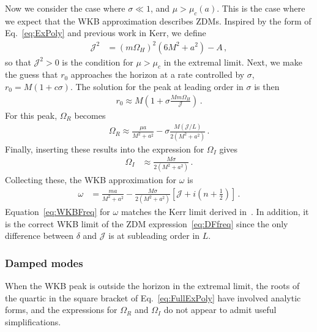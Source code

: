 \begin{refsection}
Now we consider the case where $\sigma \ll1$, and $\mu >\mu_c(a)$. This is the case where we expect that the WKB approximation describes ZDMs. 
Inspired by the form of Eq.~\eqref{eq:ExPoly} and previous work in Kerr, we define
\begin{align}
\mathcal J^2 & = (m \Omega_H)^2(6M^2 +a^2) - A \,,
\end{align}
so that $\mathcal J^2  > 0$ is the condition for $\mu > \mu_c$ in the extremal limit. 
Next, we make the guess that $r_0$ approaches the horizon at a rate controlled by $\sigma$, $r_0 = M( 1+ c \sigma)$.
The solution for the peak at leading order in $\sigma$ is then
\begin{align}
r_0 \approx M\left(1 + \sigma \frac{M m \Omega_H}{\mathcal J} \right) \,.
\end{align}
For this peak, $\Omega_R$ becomes
\begin{align}
\label{eq:WKBOmegaZDM}
\Omega_R \approx \frac{\mu a}{M^2+a^2} - \sigma \frac{M (\mathcal J/L)}{2(M^2+a^2)} \,.
\end{align}
Finally, inserting these results into the expression for $\Omega_I$ gives
\begin{align}
\Omega_I & \approx \frac{M \sigma}{2(M^2+a^2)}\,.
\end{align}
Collecting these, the WKB approximation for $\omega$ is
\begin{align}
\label{eq:WKBFreq}
\omega & = \frac{m a}{M^2 +a^2} - \frac{M \sigma}{2(M^2+a^2)} \left[ \mathcal J + i \left(n + \frac 12 \right) \right]\,.
\end{align}
Equation~\eqref{eq:WKBFreq} for $\omega$ matches the Kerr limit derived in~\cite{Yang:2012he,Yang:2013uba}. 
In addition, it is the correct WKB limit of the ZDM expression~\eqref{eq:DFfreq} since the only difference between $\delta$ and $\mathcal J$ is at subleading order in $L$. 


\subsubsection{Damped modes}
\label{sec:DampedModes}

When the WKB peak is outside the horizon in the extremal limit, the roots of the quartic in the square bracket of Eq.~\eqref{eq:FullExPoly} have involved analytic forms, and the expressions for $\Omega_R$ and $\Omega_I$ do not appear to admit useful simplifications.


\end{refsection}
